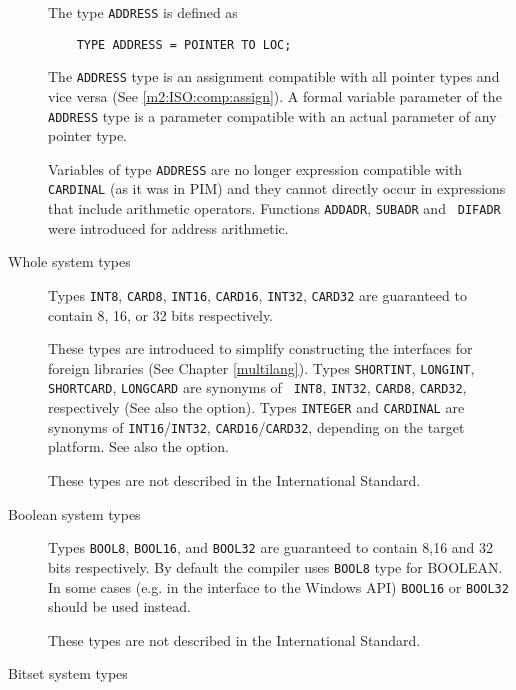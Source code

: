 \begin{description}
        The type \verb'ADDRESS' is defined as

\verb'    TYPE ADDRESS = POINTER TO LOC;'

        The \verb'ADDRESS' type is an assignment compatible  with  all
        pointer types and vice versa (See
        \ref{m2:ISO:comp:assign}). A formal variable parameter of
        the \verb'ADDRESS' type is a parameter compatible with an actual
        parameter of any pointer type.

        Variables of type \verb'ADDRESS' are no longer expression
        compatible with \verb'CARDINAL' (as it was in PIM) and they cannot
        directly occur in expressions that include arithmetic
        operators. Functions {\tt ADDADR}, {\tt SUBADR} and {\tt
        DIFADR} were introduced for address arithmetic.

\item[Whole system types] \mbox{}   

        Types {\tt INT8}, {\tt CARD8}, {\tt INT16}, {\tt CARD16},
        {\tt  INT32},  {\tt  CARD32} are guaranteed to contain 8,
        16,  or  32  bits  respectively.

        These types are introduced to simplify constructing the
        interfaces for foreign libraries   (See   Chapter
        \ref{multilang}).  Types  {\tt  SHORTINT}, {\tt LONGINT},
        {\tt  SHORTCARD},  {\tt  LONGCARD}  are  synonyms of {\tt
        INT8},   {\tt   INT32},   {\tt   CARD8},   {\tt   CARD32},
        respectively  (See  also  the   option).
        Types  {\tt  INTEGER}  and {\tt CARDINAL} are synonyms of
        {\tt   INT16}/{\tt  INT32},  {\tt  CARD16}/{\tt  CARD32},
        depending on the target platform. See also the  option.

        These types are not described in the International
        Standard.

\item[Boolean system types] \mbox{}

        Types {\tt BOOL8}, {\tt BOOL16}, and {\tt BOOL32} are guaranteed
        to contain 8,16 and 32 bits respectively. By default
        the compiler uses {\tt BOOL8} type for BOOLEAN.
        In some cases (e.g. in the interface to the Windows API) {\tt BOOL16}
        or {\tt BOOL32} should be used instead.

        These types are not described in the International
        Standard.


\item[Bitset system types] \mbox{}


\end{description}
